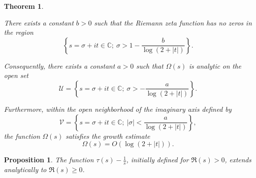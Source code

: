 \documentclass[10pt,a4paper]{amsart}
\newtheorem{theorem}{Theorem}
\newtheorem{proposition}{Proposition}
\newcommand{\C}{\mathbb{C}}
\newcommand{\difrac}{\displaystyle \frac}
\begin{document}
\begin{theorem} \label{wellknowntheorem2}

There exists a constant $b > 0$ such that the Riemann zeta function has no zeros in the region $$\left\{s = \sigma + it \in \C; \ \sigma > 1 - \difrac{b}{\log(2+|t|)}\right\}.$$

\noindent Consequently, there exists a constant $a > 0$ such that $\Omega(s)$ is analytic on the open set $$\mathcal{U} = \left\{s = \sigma + it \in \C; \ \sigma > - \difrac{a}{\log(2+|t|)}\right\}.$$

\noindent Furthermore, within the open neighborhood of the imaginary axis defined by $$\mathcal{V} = \left\{s = \sigma + it \in \C; \ |\sigma| < \difrac{a}{\log(2+|t|)}\right\},$$ the function $\Omega(s)$ satisfies the growth estimate $$\Omega(s) = O(\log(2 + |t|)).$$ 

\end{theorem}

\begin{proposition}

The function $\tau(s) - \difrac{1}{s}$, initially defined for $\Re(s) > 0$, extends analytically to $\Re(s) \geq 0$.

\end{proposition}
\end{document}
